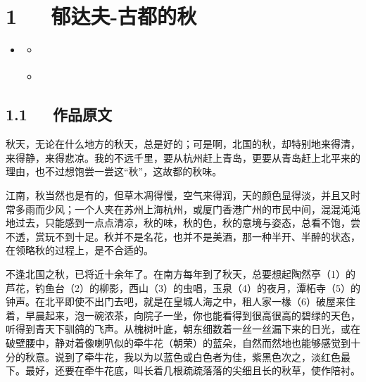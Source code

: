 \documentclass[letterpaper,12pt,english]{sphinxmanual}
\begin{document}
\chapter{1   郁达夫-古都的秋}
\label{\detokenize{p01_u6563_u6587/_u90c1_u8fbe_u592b-_u53e4_u90fd_u7684_u79cb:id1}}\label{\detokenize{p01_u6563_u6587/_u90c1_u8fbe_u592b-_u53e4_u90fd_u7684_u79cb::doc}}
\begin{sphinxShadowBox}
\begin{itemize}
\item {} 
\label{\detokenize{p01_u6563_u6587/_u90c1_u8fbe_u592b-_u53e4_u90fd_u7684_u79cb:id5}}{\hyperref[\detokenize{p01_u6563_u6587/_u90c1_u8fbe_u592b-_u53e4_u90fd_u7684_u79cb:id1}]{}}
\begin{itemize}
\item {} 
\label{\detokenize{p01_u6563_u6587/_u90c1_u8fbe_u592b-_u53e4_u90fd_u7684_u79cb:id6}}{\hyperref[\detokenize{p01_u6563_u6587/_u90c1_u8fbe_u592b-_u53e4_u90fd_u7684_u79cb:id3}]{}}

\item {} 
\label{\detokenize{p01_u6563_u6587/_u90c1_u8fbe_u592b-_u53e4_u90fd_u7684_u79cb:id7}}{\hyperref[\detokenize{p01_u6563_u6587/_u90c1_u8fbe_u592b-_u53e4_u90fd_u7684_u79cb:id4}]{}}

\end{itemize}

\end{itemize}
\end{sphinxShadowBox}


\section{1.1   作品原文}
\label{\detokenize{p01_u6563_u6587/_u90c1_u8fbe_u592b-_u53e4_u90fd_u7684_u79cb:id3}}
秋天，无论在什么地方的秋天，总是好的；可是啊，北国的秋，却特别地来得清，来得静，来得悲凉。我的不远千里，要从杭州赶上青岛，更要从青岛赶上北平来的理由，也不过想饱尝一尝这“秋”，这故都的秋味。

江南，秋当然也是有的，但草木凋得慢，空气来得润，天的颜色显得淡，并且又时常多雨而少风；一个人夹在苏州上海杭州，或厦门香港广州的市民中间，混混沌沌地过去，只能感到一点点清凉，秋的味，秋的色，秋的意境与姿态，总看不饱，尝不透，赏玩不到十足。秋并不是名花，也并不是美酒，那一种半开、半醉的状态，在领略秋的过程上，是不合适的。

不逢北国之秋，已将近十余年了。在南方每年到了秋天，总要想起陶然亭（1）的芦花，钓鱼台（2）的柳影，西山（3）的虫唱，玉泉（4）的夜月，潭柘寺（5）的钟声。在北平即使不出门去吧，就是在皇城人海之中，租人家一椽（6）破屋来住着，早晨起来，泡一碗浓茶，向院子一坐，你也能看得到很高很高的碧绿的天色，听得到青天下驯鸽的飞声。从槐树叶底，朝东细数着一丝一丝漏下来的日光，或在破壁腰中，静对着像喇叭似的牵牛花（朝荣）的蓝朵，自然而然地也能够感觉到十分的秋意。说到了牵牛花，我以为以蓝色或白色者为佳，紫黑色次之，淡红色最下。最好，还要在牵牛花底，叫长着几根疏疏落落的尖细且长的秋草，使作陪衬。
\end{document}
